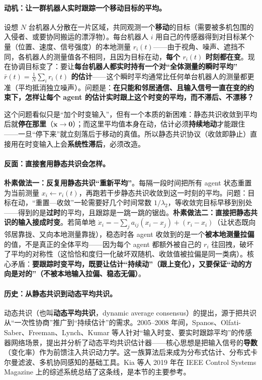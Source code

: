 \paragraph{动机：让一群机器人实时跟踪一个移动目标的平均。}
设想 $N$ 台机器人分散在一片区域，共同观测一个\textbf{移动}的目标（需要被多机包围的入侵者、或要协同搬运的漂浮物）。每台机器人 $i$ 用自己的传感器得到对目标某个量（位置、速度、信号强度）的本地测量 $r_i(t)$——由于视角、噪声、遮挡不同，各机器人的测量值各不相同，且因为目标在动，\textbf{每个 $r_i(t)$ 时刻都在变}。现在协调目标变了：要让\textbf{每台机器人都实时持有一个对“全体测量的瞬时平均” $\bar r(t)=\tfrac1N\sum_i r_i(t)$ 的估计}——这个瞬时平均通常比任何单台机器人的测量都更准（平均抵消独立噪声）。问题是：\textbf{在只能和邻居通信、且输入信号一直在变的约束下，怎样让每个 agent 的估计实时跟上这个时变的平均，而不滞后、不漂移？}

这个问题看似只是“加个时变输入”，但有一个本质的新困难：静态共识收敛到平均后就\textbf{停在那里}（$\dot{\mathbf{x}}\to\mathbf{0}$）；而这里平均值本身在动，估计必须\textbf{持续地动}才能跟住——一旦“停下来”就立刻落后于移动的真值。所以静态共识协议（收敛即静止）直接用在时变输入上会\textbf{系统性滞后}，必须改造。

\paragraph{反面：直接套用静态共识会怎样。}
\textbf{朴素做法一：反复用静态共识“重新平均”}。每隔一段时间把所有 agent 状态重置为当前测量 $x_i\leftarrow r_i(t)$，再跑若干步静态共识收敛到这一时刻的平均。问题：目标在动，“重置—收敛”一轮需要好几个时间常数 $1/\lambda_2$，等收敛完目标早移到别处——得到的是\textbf{过时}的平均，且跟踪是一跳一跳的锯齿。\textbf{朴素做法二：直接把静态共识的输入接成时变}。若简单地 $\dot x_i=-\sum_j a_{ij}(x_i-x_j)+(r_i-x_i)$（让状态既向邻居靠拢、又向本地测量靠拢），稳态时各 agent 收敛到的是一个\textbf{被本地测量拉偏}的值，不是真正的全体平均——因为每个 agent 都额外被自己的 $r_i$ 往回拽，破坏了平均的对称性（这恰恰和度归一化破坏双随机、收敛值被拉偏是同一类病）。核心矛盾：\textbf{要跟踪时变平均，既要让估计“持续动”（跟上变化），又要保证“动的方向是对的”（不被本地输入拉偏、稳态无偏）}。

\paragraph{历史：从静态共识到动态平均共识。}
动态共识（也叫\textbf{动态平均共识}，dynamic average consensus）的提出，源于把共识从“一次性协商”推广到“持续估计”的需求。2005--2008 年间，Spanos、Olfati-Saber、Freeman、Lynch、Kumar 等人针对“输入时变、要实时跟踪平均”的传感器网络场景，提出并分析了动态平均共识估计器——核心思想是把输入信号的\textbf{导数}（变化率）作为前馈注入共识动力学。这一族算法后来成为分布式估计、分布式卡尔曼滤波、多机协同感知的基础工具。Kia 等人 2019 年在 IEEE Control Systems Magazine 上的综述系统总结了这条线，是本节的主要参考\cite{kia2019dynamic}。

